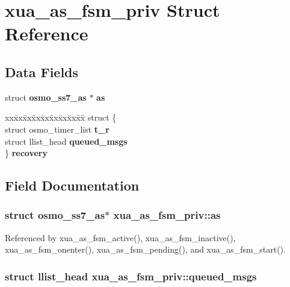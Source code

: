 \section{xua\+\_\+as\+\_\+fsm\+\_\+priv Struct Reference}
\label{structxua__as__fsm__priv}
\subsection*{Data Fields}
\begin{DoxyCompactItemize}
\item 
struct {\bf osmo\+\_\+ss7\+\_\+as} $\ast$ {\bf as}
\item 
\begin{tabbing}
xx\=xx\=xx\=xx\=xx\=xx\=xx\=xx\=xx\=\kill
struct \{\\
\>struct osmo\_timer\_list {\bf t\_r}\\
\>struct llist\_head {\bf queued\_msgs}\\
\} {\bf recovery}\\

\end{tabbing}\end{DoxyCompactItemize}


\subsection{Field Documentation}
\subsubsection[{as}]{\setlength{\rightskip}{0pt plus 5cm}struct {\bf osmo\+\_\+ss7\+\_\+as}$\ast$ xua\+\_\+as\+\_\+fsm\+\_\+priv\+::as}\label{structxua__as__fsm__priv_aa1ab019197818b702ba8a3195e246a39}


Referenced by xua\+\_\+as\+\_\+fsm\+\_\+active(), xua\+\_\+as\+\_\+fsm\+\_\+inactive(), xua\+\_\+as\+\_\+fsm\+\_\+onenter(), xua\+\_\+as\+\_\+fsm\+\_\+pending(), and xua\+\_\+as\+\_\+fsm\+\_\+start().

\subsubsection[{queued\+\_\+msgs}]{\setlength{\rightskip}{0pt plus 5cm}struct llist\+\_\+head xua\+\_\+as\+\_\+fsm\+\_\+priv\+::queued\+\_\+msgs}\label{structxua__as__fsm__priv_af7164209400062720f358a79f47fb99b}


